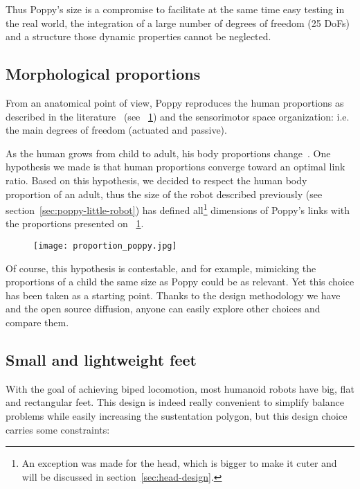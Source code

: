 Thus Poppy's size is a compromise to facilitate at the same time easy testing in the real world, the integration of a large number of degrees of freedom (25 DoFs) and a structure those dynamic properties cannot be neglected.

\subsection{Morphological proportions} %

From an anatomical point of view, Poppy reproduces the human proportions as described in the literature~\parencite{dufour2005biomecanique} (see \figurename~\ref{fig:poppy-human-proportion}) and the sensorimotor space organization: i.e. the main degrees of freedom (actuated and passive).

As the human grows from child to adult, his body proportions change~\parencite{bogin2010leg}. One hypothesis we made is that human proportions converge toward an optimal link ratio. Based on this hypothesis, we decided to respect the human body proportion of an adult, thus the size of the robot described previously (see section~\ref{sec:poppy-little-robot}) has defined all\footnote{An exception was made for the head, which is bigger to make it cuter and will be discussed in section~\ref{sec:head-design}.} dimensions  of Poppy's links with the proportions presented on \figurename~\ref{fig:poppy-human-proportion}.

\begin{figure}[tb]
    \begin{center}
        \texttt{[image: proportion\_poppy.jpg]}
    \end{center}
    \caption{}
    \label{fig:poppy-human-proportion}
\end{figure}

Of course, this hypothesis is contestable, and for example, mimicking the proportions of a child the same size as Poppy could be as relevant. Yet this choice has been taken as a starting point. Thanks to the design methodology we have and the open source diffusion, anyone can easily explore other choices and compare them.

\subsection{Small and lightweight feet} %

With the goal of achieving biped locomotion, most humanoid robots have big, flat and rectangular feet. This design is indeed really convenient to simplify balance problems while easily increasing the sustentation polygon, but this design choice carries some constraints:

